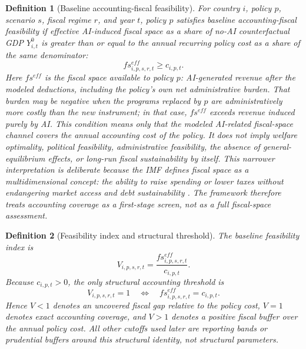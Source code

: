 \documentclass[11pt,a4paper]{article}
\newtheorem{definition}{Definition}
\begin{document}
\begin{definition}[Baseline accounting-fiscal feasibility]
For country $i$, policy $p$, scenario $s$, fiscal regime $r$, and year $t$, policy $p$ satisfies \emph{baseline accounting-fiscal feasibility} if effective AI-induced fiscal space as a share of no-AI counterfactual GDP $Y^0_{i,t}$ is greater than or equal to the annual recurring policy cost as a share of the same denominator:
\begin{equation}
    fs^{eff}_{i,p,s,r,t}\geq c_{i,p,t}.
\end{equation}
Here $fs^{eff}$ is the fiscal space available to policy $p$: AI-generated revenue after the modeled deductions, including the policy's own net administrative burden. That burden may be negative when the programs replaced by $p$ are administratively more costly than the new instrument; in that case, $fs^{eff}$ exceeds revenue induced purely by AI.
This condition means only that the modeled AI-related fiscal-space channel covers the annual accounting cost of the policy. It does not imply welfare optimality, political feasibility, administrative feasibility, the absence of general-equilibrium effects, or long-run fiscal sustainability by itself. This narrower interpretation is deliberate because the IMF defines fiscal space as a multidimensional concept: the ability to raise spending or lower taxes without endangering market access and debt sustainability \citep{imf2016fiscalspace}. The framework therefore treats accounting coverage as a first-stage screen, not as a full fiscal-space assessment.
\end{definition}

\begin{definition}[Feasibility index and structural threshold]
The baseline feasibility index is
\begin{equation}
    V_{i,p,s,r,t}=\frac{fs^{eff}_{i,p,s,r,t}}{c_{i,p,t}}.
\end{equation}
Because $c_{i,p,t}>0$, the only structural accounting threshold is
\begin{equation}
    V_{i,p,s,r,t}=1 \quad \Longleftrightarrow \quad fs^{eff}_{i,p,s,r,t}=c_{i,p,t}.
\end{equation}
Hence $V<1$ denotes an uncovered fiscal gap relative to the policy cost, $V=1$ denotes exact accounting coverage, and $V>1$ denotes a positive fiscal buffer over the annual policy cost. All other cutoffs used later are reporting bands or prudential buffers around this structural identity, not structural parameters.
\end{definition}
\end{document}
